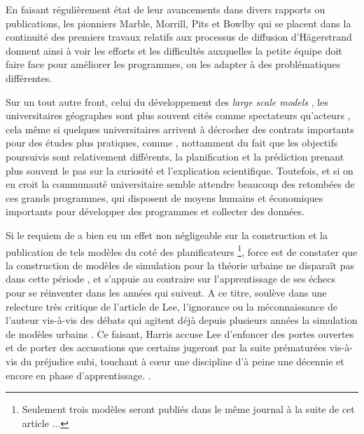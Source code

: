 En faisant régulièrement état de leur avancements dans divers rapports ou publications, les pionniers Marble, Morrill, Pits et Bowlby \autocite{Pitts1963} qui se placent dans la continuité des premiers travaux relatifs aux processus de diffusion d'Hägerstrand \autocite{Hagerstrand1953, Hagerstrand1967a} donnent ainsi à voir les efforts et les difficultés auxquelles la petite équipe doit faire face pour améliorer les programmes, ou les adapter à des problématiques différentes.

Sur un tout autre front, celui du développement des \textit{large scale models} \autocites[8]{Batty1976}, les universitaires géographes sont plus souvent cités comme spectateurs qu'acteurs \autocite[9]{Batty1994}, cela même si quelques universitaires arrivent à décrocher des contrats importants \autocite{Barnes2006a} pour des études plus pratiques, comme \textcite{Garrison1959}, nottamment du fait que les objectifs poursuivis sont relativement différents, la planification et la prédiction prenant plus souvent le pas sur la curiosité et l'explication scientifique. Toutefois, et si on en croit \textcite{Haggett1969} la communauté universitaire semble attendre beaucoup des retombées de ces grands programmes, qui disposent de moyens humains et économiques importants pour développer des programmes et collecter des données.

Si le requiem de \textcite{Lee1973} a bien eu un effet non négligeable sur la construction et la publication de tels modèles du coté des planificateurs \footnote{Seulement trois modèles seront publiés dans le même journal à la suite de cet article ...}, force est de constater que la construction de modèles de simulation pour la théorie urbaine ne disparaît pas dans cette période \autocite[11-12]{Batty1994}, et s'appuie au contraire sur l'apprentissage de ses échecs pour se réinventer dans les années qui suivent. A ce titre, \textcite{Harris1994} soulève dans une relecture très critique de l'article de Lee, l'ignorance ou la méconnaissance de l'auteur vis-à-vis des débats qui agitent déjà depuis plusieurs années la simulation de modèles urbains \autocites{Batty1971, Wilson1970, Orcutt1957, Harris1968}. Ce faisant, Harris accuse Lee d'enfoncer des portes ouvertes et de porter des accusations que certains jugeront par la suite prématurées vis-à-vis du préjudice subi, touchant à cœur une discipline d'à peine une décennie et encore en phase d'apprentissage. \autocite[p11]{Batty1994}.

